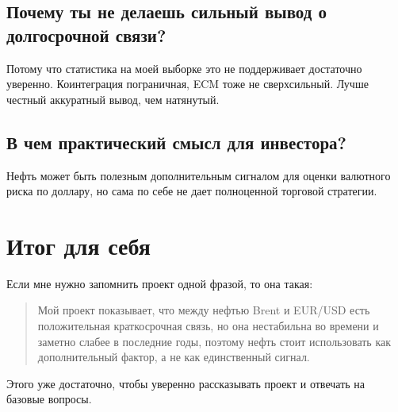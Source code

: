 \documentclass[a4paper,12pt]{article}
\begin{document}
\subsection{Почему ты не делаешь сильный вывод о долгосрочной связи?}
Потому что статистика на моей выборке это не поддерживает достаточно уверенно. Коинтеграция пограничная, ECM тоже не сверхсильный. Лучше честный аккуратный вывод, чем натянутый.

\subsection{В чем практический смысл для инвестора?}
Нефть может быть полезным дополнительным сигналом для оценки валютного риска по доллару, но сама по себе не дает полноценной торговой стратегии.

\section{Итог для себя}
Если мне нужно запомнить проект одной фразой, то она такая:

\begin{quote}
Мой проект показывает, что между нефтью Brent и EUR/USD есть положительная краткосрочная связь, но она нестабильна во времени и заметно слабее в последние годы, поэтому нефть стоит использовать как дополнительный фактор, а не как единственный сигнал.
\end{quote}

Этого уже достаточно, чтобы уверенно рассказывать проект и отвечать на базовые вопросы.
\end{document}
